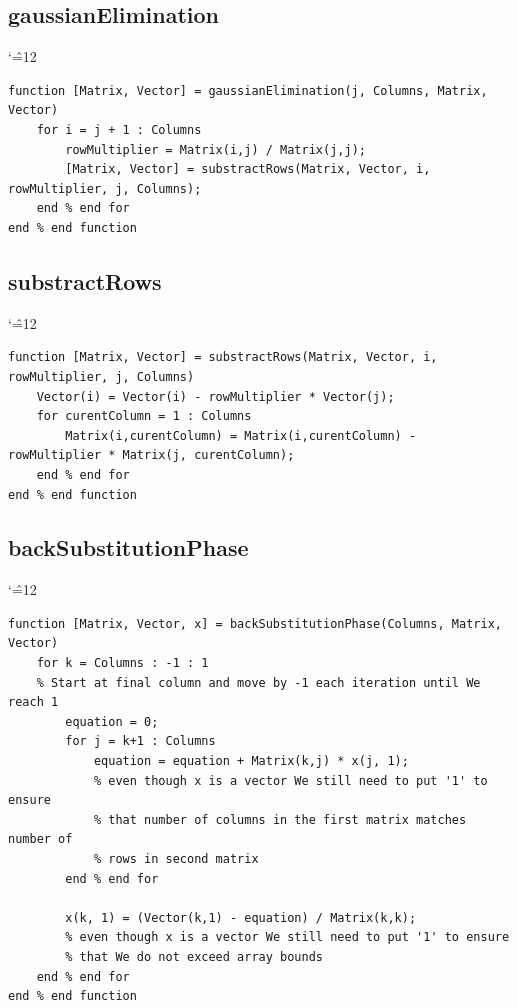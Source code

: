 \documentclass[12pt]{report}
\newenvironment{simplechar}{%
   \catcode`\^=12
}{}
\begin{document}
\subsection{gaussianElimination}
\begin{simplechar}
\begin{lstlisting}
function [Matrix, Vector] = gaussianElimination(j, Columns, Matrix, Vector)
    for i = j + 1 : Columns
        rowMultiplier = Matrix(i,j) / Matrix(j,j);
        [Matrix, Vector] = substractRows(Matrix, Vector, i, rowMultiplier, j, Columns);
    end % end for
end % end function
\end{lstlisting}
\end{simplechar}

\subsection{substractRows}
\begin{simplechar}
\begin{lstlisting}
function [Matrix, Vector] = substractRows(Matrix, Vector, i, rowMultiplier, j, Columns)
    Vector(i) = Vector(i) - rowMultiplier * Vector(j);
    for curentColumn = 1 : Columns
        Matrix(i,curentColumn) = Matrix(i,curentColumn) - rowMultiplier * Matrix(j, curentColumn);
    end % end for
end % end function
\end{lstlisting}
\end{simplechar}

\newpage
\subsection{backSubstitutionPhase}
\begin{simplechar}
\begin{lstlisting}
function [Matrix, Vector, x] = backSubstitutionPhase(Columns, Matrix, Vector)
    for k = Columns : -1 : 1
    % Start at final column and move by -1 each iteration until We reach 1
        equation = 0;
        for j = k+1 : Columns
            equation = equation + Matrix(k,j) * x(j, 1);
            % even though x is a vector We still need to put '1' to ensure
            % that number of columns in the first matrix matches number of
            % rows in second matrix
        end % end for

        x(k, 1) = (Vector(k,1) - equation) / Matrix(k,k);
        % even though x is a vector We still need to put '1' to ensure
        % that We do not exceed array bounds
    end % end for
end % end function
\end{lstlisting}
\end{simplechar}
\end{document}
